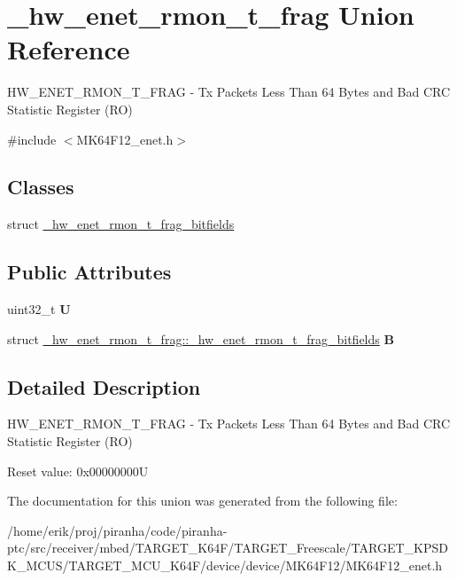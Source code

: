 \hypertarget{union__hw__enet__rmon__t__frag}{}\section{\+\_\+hw\+\_\+enet\+\_\+rmon\+\_\+t\+\_\+frag Union Reference}
\label{union__hw__enet__rmon__t__frag}


H\+W\+\_\+\+E\+N\+E\+T\+\_\+\+R\+M\+O\+N\+\_\+\+T\+\_\+\+F\+R\+AG -\/ Tx Packets Less Than 64 Bytes and Bad C\+RC Statistic Register (RO)  




{\ttfamily \#include $<$M\+K64\+F12\+\_\+enet.\+h$>$}

\subsection*{Classes}
\begin{DoxyCompactItemize}
\item 
struct \hyperlink{struct__hw__enet__rmon__t__frag_1_1__hw__enet__rmon__t__frag__bitfields}{\+\_\+hw\+\_\+enet\+\_\+rmon\+\_\+t\+\_\+frag\+\_\+bitfields}
\end{DoxyCompactItemize}
\subsection*{Public Attributes}
\begin{DoxyCompactItemize}
\item 
uint32\+\_\+t {\bfseries U}\hypertarget{union__hw__enet__rmon__t__frag_a6dff7e377f8f2aee4edf50d7294ad35a}{}\label{union__hw__enet__rmon__t__frag_a6dff7e377f8f2aee4edf50d7294ad35a}

\item 
struct \hyperlink{struct__hw__enet__rmon__t__frag_1_1__hw__enet__rmon__t__frag__bitfields}{\+\_\+hw\+\_\+enet\+\_\+rmon\+\_\+t\+\_\+frag\+::\+\_\+hw\+\_\+enet\+\_\+rmon\+\_\+t\+\_\+frag\+\_\+bitfields} {\bfseries B}\hypertarget{union__hw__enet__rmon__t__frag_a6864ad42302687aaa8f2b9a8b48b1e65}{}\label{union__hw__enet__rmon__t__frag_a6864ad42302687aaa8f2b9a8b48b1e65}

\end{DoxyCompactItemize}


\subsection{Detailed Description}
H\+W\+\_\+\+E\+N\+E\+T\+\_\+\+R\+M\+O\+N\+\_\+\+T\+\_\+\+F\+R\+AG -\/ Tx Packets Less Than 64 Bytes and Bad C\+RC Statistic Register (RO) 

Reset value\+: 0x00000000U

The documentation for this union was generated from the following file\+:\begin{DoxyCompactItemize}
\item 
/home/erik/proj/piranha/code/piranha-\/ptc/src/receiver/mbed/\+T\+A\+R\+G\+E\+T\+\_\+\+K64\+F/\+T\+A\+R\+G\+E\+T\+\_\+\+Freescale/\+T\+A\+R\+G\+E\+T\+\_\+\+K\+P\+S\+D\+K\+\_\+\+M\+C\+U\+S/\+T\+A\+R\+G\+E\+T\+\_\+\+M\+C\+U\+\_\+\+K64\+F/device/device/\+M\+K64\+F12/M\+K64\+F12\+\_\+enet.\+h\end{DoxyCompactItemize}
